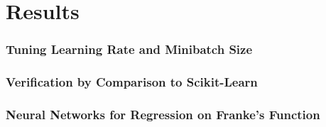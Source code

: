 \section{Results}
\label{sec:results}

\subsubsection{Tuning Learning Rate and Minibatch Size}



\subsubsection{Verification by Comparison to Scikit-Learn}

\subsubsection{Neural Networks for Regression on Franke's Function}


\begin{figure}[htbp]
	\centering
	\caption{}
	\label{fig:}
\end{figure}
